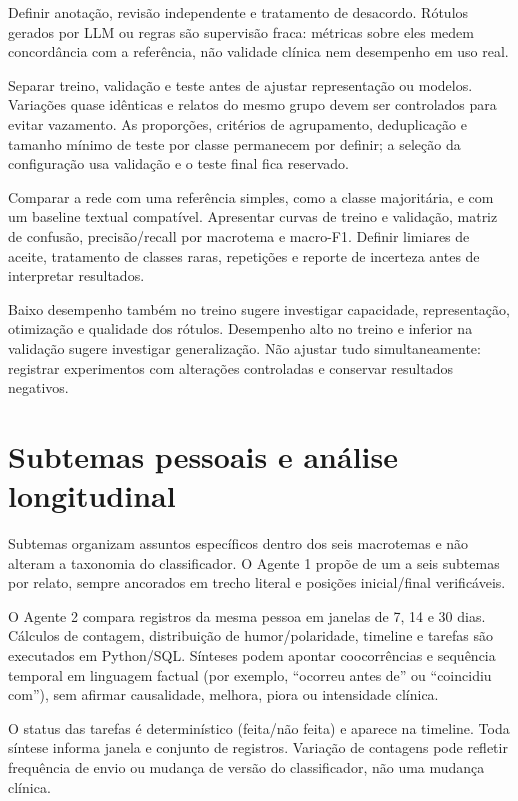 \documentclass[11pt,a4paper]{article}
\begin{document}
Definir anotação, revisão independente e tratamento de desacordo. Rótulos gerados por LLM ou regras são supervisão fraca: métricas sobre eles medem concordância com a referência, não validade clínica nem desempenho em uso real.

Separar treino, validação e teste antes de ajustar representação ou modelos. Variações quase idênticas e relatos do mesmo grupo devem ser controlados para evitar vazamento. As proporções, critérios de agrupamento, deduplicação e tamanho mínimo de teste por classe permanecem por definir; a seleção da configuração usa validação e o teste final fica reservado.

Comparar a rede com uma referência simples, como a classe majoritária, e com um baseline textual compatível. Apresentar curvas de treino e validação, matriz de confusão, precisão/recall por macrotema e macro-F1. Definir limiares de aceite, tratamento de classes raras, repetições e reporte de incerteza antes de interpretar resultados.

Baixo desempenho também no treino sugere investigar capacidade, representação, otimização e qualidade dos rótulos. Desempenho alto no treino e inferior na validação sugere investigar generalização. Não ajustar tudo simultaneamente: registrar experimentos com alterações controladas e conservar resultados negativos.

\section{Subtemas pessoais e análise longitudinal}
Subtemas organizam assuntos específicos dentro dos seis macrotemas e não alteram a taxonomia do classificador. O Agente 1 propõe de um a seis subtemas por relato, sempre ancorados em trecho literal e posições inicial/final verificáveis.

O Agente 2 compara registros da mesma pessoa em janelas de 7, 14 e 30 dias. Cálculos de contagem, distribuição de humor/polaridade, timeline e tarefas são executados em Python/SQL. Sínteses podem apontar coocorrências e sequência temporal em linguagem factual (por exemplo, “ocorreu antes de” ou “coincidiu com”), sem afirmar causalidade, melhora, piora ou intensidade clínica.

O status das tarefas é determinístico (feita/não feita) e aparece na timeline. Toda síntese informa janela e conjunto de registros. Variação de contagens pode refletir frequência de envio ou mudança de versão do classificador, não uma mudança clínica.
\end{document}
